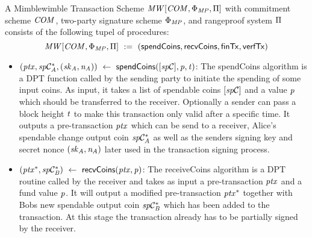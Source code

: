 
\begin{definition}
    \label{def:atom:mw-tx-scheme}
    A Mimblewimble Transaction Scheme $\mathit{MW}[\mathit{COM},\Phi_{\mathit{MP}},\Pi]$ with commitment scheme $\mathit{COM}$, two-party signature scheme $\Phi_{\mathit{MP}}$, and rangeproof system $\Pi$ consists of the following tupel of procedures:
    \[ \mathit{MW}[\mathit{COM},\Phi_{\mathit{MP}},\Pi] ~:=~ ( \mathsf{spendCoins},\mathsf{recvCoins},\mathsf{finTx},\mathsf{verfTx} ) \]
    \begin{itemize}
        \item $(\mathit{ptx}, \mathit{sp}\mathcal{C}_{\mathit{A}}^*, (\mathit{sk}_{\mathit{A}}, \mathit{\mathit{n}_{\mathit{A}}})) ~\leftarrow~ \mathsf{spendCoins}([\mathit{sp}\mathcal{C}],\mathit{p},\mathit{t})$: The spendCoins algorithm is a DPT function called by the sending party to initiate the spending of some input coins.
        As input, it takes a list of spendable coins $[\mathit{sp}\mathcal{C}]$ and a value $\mathit{p}$ which should be transferred to the receiver.
        Optionally a sender can pass a block height $\mathit{t}$ to make this transaction only valid after a specific time.
        It outputs a pre-transaction $\mathit{ptx}$ which can be send to a receiver, Alice's spendable change output coin $\mathit{sp}\mathcal{C}_{\mathit{A}}^*$ as well as the senders signing key and secret nonce $(\mathit{sk}_{\mathit{A}}, \mathit{\mathit{n}_{\mathit{A}}})$ later used in the transaction signing process.
        \item $(\mathit{ptx}^*, \mathit{sp}\mathcal{C}_{\mathit{B}}^*) ~\leftarrow~ \mathsf{recvCoins}(\mathit{ptx},\mathit{p})$: The receiveCoins algorithm is a DPT routine called by the receiver and takes as input a pre-transaction $\mathit{ptx}$ and a fund value
        $\mathit{p}$.
        It will output a modified pre-transaction $\mathit{ptx}^*$ together with Bobs new spendable output coin $\mathit{sp}\mathcal{C}_{\mathit{B}}^*$ which has been added to the transaction.
        At this stage the transaction already has to be partially signed by the receiver. 
        

\end{itemize}
\end{definition}

